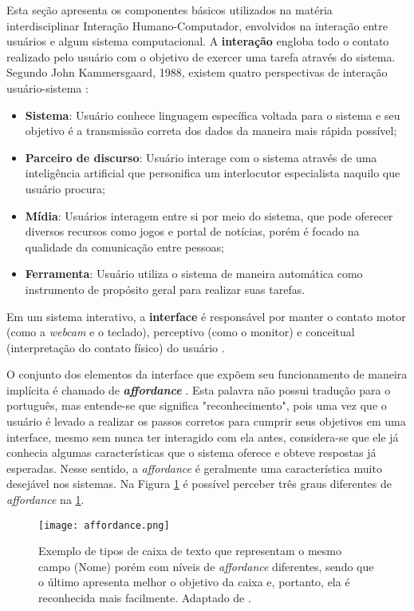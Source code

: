 \indent Esta seção apresenta os componentes básicos utilizados na matéria interdisciplinar Interação Humano-Computador, envolvidos na interação entre usuários e algum sistema computacional. A \textbf{interação} engloba todo o contato realizado pelo usuário com o objetivo de exercer uma tarefa através do sistema. Segundo John Kammersgaard, 1988, existem quatro perspectivas de interação usuário-sistema \cite{IHCbook}:
\begin{itemize}
\item[1] \textbf{Sistema}: Usuário conhece linguagem específica voltada para o sistema e seu objetivo é a transmissão correta dos dados da maneira mais rápida possível;
\item[2] \textbf{Parceiro de discurso}: Usuário interage com o sistema através de uma inteligência artificial que personifica um interlocutor especialista naquilo que usuário procura;
\item[3] \textbf{Mídia}: Usuários interagem entre si por meio do sistema, que pode oferecer diversos recursos como jogos e portal de notícias, porém é focado na qualidade da comunicação entre pessoas;
\item[4] \textbf{Ferramenta}: Usuário utiliza o sistema de maneira automática como instrumento de propósito geral para realizar suas tarefas. 
\end{itemize}

\indent Em um sistema interativo, a \textbf{interface} é responsável por manter o contato motor (como a \textit{webcam} e o teclado), perceptivo (como o monitor) e conceitual (interpretação do contato físico) do usuário \cite{IHCbook}. 

\indent O conjunto dos elementos da interface que expõem seu funcionamento de maneira implícita é chamado de \textbf{\textit{affordance}} \cite{IHCbook}. Esta palavra não possui tradução para o português, mas entende-se que significa "reconhecimento", pois uma vez que o usuário é levado a realizar os passos corretos para cumprir seus objetivos em uma interface, mesmo sem nunca ter interagido com ela antes, considera-se que ele já conhecia algumas características que o sistema oferece e obteve respostas já esperadas. Nesse sentido, a \textit{affordance} é geralmente uma característica muito desejável nos sistemas. Na Figura \ref{fig:Affordance} é possível perceber três graus diferentes de \textit{affordance} na \ref{fig:Affordance}.

\begin{figure}[!h]
    \centering
    \texttt{[image: affordance.png]}
    \caption{Exemplo de tipos de caixa de texto que representam o mesmo campo (Nome) porém com níveis de \textit{affordance} diferentes, sendo que o último apresenta melhor o objetivo da caixa e, portanto, ela é reconhecida mais facilmente. Adaptado de \cite{affordance}.}
    \label{fig:Affordance}
\end{figure} 

